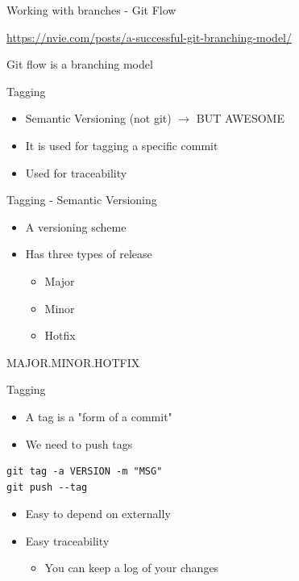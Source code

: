 \documentclass[table,svgnames,aspectratio=169]{beamer}
\begin{document}
\begin{frame}[label={sec:org90eca7d}]{Working with branches - Git Flow}
\begin{center}
\href{https://nvie.com/posts/a-successful-git-branching-model/}{https://nvie.com/posts/a-successful-git-branching-model/}
\end{center}
Git flow is a branching model
\end{frame}

\begin{frame}[label={sec:org5af6d69}]{Tagging}
\begin{itemize}
\item Semantic Versioning (not git) \(\rightarrow\) BUT AWESOME
\item It is used for tagging a specific commit
\item Used for traceability
\end{itemize}
\end{frame}

\begin{frame}[label={sec:org3196f61}]{Tagging - Semantic Versioning}
\begin{itemize}
\item A versioning scheme
\item Has three types of release 
\begin{itemize}
\item Major
\item Minor
\item Hotfix
\end{itemize}
\end{itemize}

\begin{center}
\alert{MAJOR.MINOR.HOTFIX}
\end{center}
\end{frame}

\begin{frame}[fragile,label={sec:org9a45915}]{Tagging}
 \begin{itemize}
\item A tag is a "form of a commit"
\item We need to push tags
\end{itemize}

\lstset{language=bash,label= ,caption= ,captionpos=b,numbers=none}
\begin{lstlisting}
git tag -a VERSION -m "MSG"
git push --tag
\end{lstlisting}

\begin{itemize}
\item Easy to depend on externally
\item Easy traceability
\begin{itemize}
\item You can keep a log of your changes
\end{itemize}
\end{itemize}
\end{frame}
\end{document}

